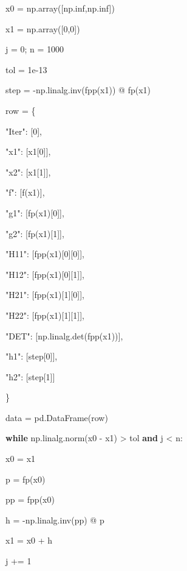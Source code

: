 \documentclass[
]{article}
\newenvironment{Shaded}{}{}
\newcommand{\ControlFlowTok}[1]{\textcolor[rgb]{0.00,0.44,0.13}{\textbf{#1}}}
\newcommand{\DecValTok}[1]{\textcolor[rgb]{0.25,0.63,0.44}{#1}}
\newcommand{\FloatTok}[1]{\textcolor[rgb]{0.25,0.63,0.44}{#1}}
\newcommand{\KeywordTok}[1]{\textcolor[rgb]{0.00,0.44,0.13}{\textbf{#1}}}
\newcommand{\NormalTok}[1]{#1}
\newcommand{\OperatorTok}[1]{\textcolor[rgb]{0.40,0.40,0.40}{#1}}
\newcommand{\StringTok}[1]{\textcolor[rgb]{0.25,0.44,0.63}{#1}}
\begin{document}
\begin{enumerate}
\begin{Shaded}
\begin{Highlighting}[]
\NormalTok{x0 }\OperatorTok{=}\NormalTok{ np.array([np.inf,np.inf])
}
\NormalTok{x1 }\OperatorTok{=}\NormalTok{ np.array([}\DecValTok{0}\NormalTok{,}\DecValTok{0}\NormalTok{])
}
\NormalTok{j }\OperatorTok{=} \DecValTok{0}\OperatorTok{;}\NormalTok{ n }\OperatorTok{=} \DecValTok{1000}

\NormalTok{tol }\OperatorTok{=} \FloatTok{1e{-}13}



\NormalTok{step }\OperatorTok{=} \OperatorTok{{-}}\NormalTok{np.linalg.inv(fpp(x1)) }\OperatorTok{@}\NormalTok{ fp(x1)
}
\NormalTok{row }\OperatorTok{=}\NormalTok{ \{
}
    \StringTok{"Iter"}\NormalTok{: [}\DecValTok{0}\NormalTok{], 
}
    \StringTok{"x1"}\NormalTok{: [x1[}\DecValTok{0}\NormalTok{]], 
}
    \StringTok{"x2"}\NormalTok{: [x1[}\DecValTok{1}\NormalTok{]],
}
    \StringTok{"f"}\NormalTok{: [f(x1)],
}
    \StringTok{"g1"}\NormalTok{: [fp(x1)[}\DecValTok{0}\NormalTok{]],
}
    \StringTok{"g2"}\NormalTok{: [fp(x1)[}\DecValTok{1}\NormalTok{]],
}
    \StringTok{"H11"}\NormalTok{: [fpp(x1)[}\DecValTok{0}\NormalTok{][}\DecValTok{0}\NormalTok{]],
}
    \StringTok{"H12"}\NormalTok{: [fpp(x1)[}\DecValTok{0}\NormalTok{][}\DecValTok{1}\NormalTok{]],
}
    \StringTok{"H21"}\NormalTok{: [fpp(x1)[}\DecValTok{1}\NormalTok{][}\DecValTok{0}\NormalTok{]],
}
    \StringTok{"H22"}\NormalTok{: [fpp(x1)[}\DecValTok{1}\NormalTok{][}\DecValTok{1}\NormalTok{]],
}
    \StringTok{"DET"}\NormalTok{: [np.linalg.det(fpp(x1))],
}
    \StringTok{"h1"}\NormalTok{: [step[}\DecValTok{0}\NormalTok{]],
}
    \StringTok{"h2"}\NormalTok{: [step[}\DecValTok{1}\NormalTok{]]
}
\NormalTok{\}
}


\NormalTok{data }\OperatorTok{=}\NormalTok{ pd.DataFrame(row)
}


\ControlFlowTok{while}\NormalTok{ np.linalg.norm(x0 }\OperatorTok{{-}}\NormalTok{ x1) }\OperatorTok{\textgreater{}}\NormalTok{ tol }\KeywordTok{and}\NormalTok{ j }\OperatorTok{\textless{}}\NormalTok{ n:
}
\NormalTok{    x0 }\OperatorTok{=}\NormalTok{ x1
}
\NormalTok{    p }\OperatorTok{=}\NormalTok{ fp(x0)
}
\NormalTok{    pp }\OperatorTok{=}\NormalTok{ fpp(x0)
}
\NormalTok{    h }\OperatorTok{=} \OperatorTok{{-}}\NormalTok{np.linalg.inv(pp) }\OperatorTok{@}\NormalTok{ p
}
\NormalTok{    x1 }\OperatorTok{=}\NormalTok{ x0 }\OperatorTok{+}\NormalTok{ h
}
\NormalTok{    j }\OperatorTok{+=} \DecValTok{1}

    


\end{Highlighting}
\end{Shaded}
\end{enumerate}
\end{document}
